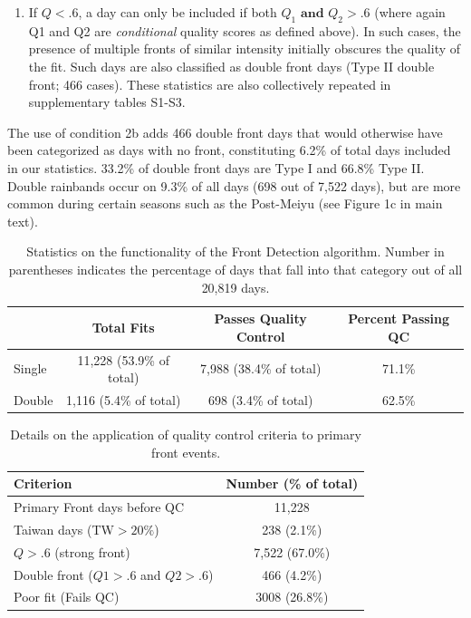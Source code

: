 \documentclass[draft,grl]{agutexSI}
\begin{document}
\begin{article}
\begin{enumerate}
\begin{enumerate}
	\item If $Q<.6$, a day can only be included if both $Q_1 \mathrm{\textbf{ and }} Q_2 > .6$ (where again Q1 and Q2 are \textit{conditional} quality scores as defined above). In such cases, the presence of multiple fronts of similar intensity initially obscures the quality of the fit. Such days are also classified as double front days (Type II double front; 466 cases). These statistics are also collectively repeated in supplementary tables S1-S3.
	
	\end{enumerate}
	
\end{enumerate}	
	
	The use of condition 2b adds 466 double front days that would otherwise have been categorized as days with no front, constituting 6.2\% of total days included in our statistics. 33.2\% of double front days are Type I and 66.8\% Type II. Double rainbands occur on 9.3\% of all days (698 out of 7,522 days), but are more common during certain seasons such as the Post-Meiyu (see Figure 1c in main text).
	
\clearpage

\begin{table}
\caption{Statistics on the functionality of the Front Detection algorithm. Number in parentheses indicates the percentage of days that fall into that category out of all 20,819 days.}
\centering

\begin{tabular}{ l c c c}
	  & Total Fits & Passes Quality Control & Percent Passing QC\\
	 \hline
	 Single & 11,228 (53.9\% of total) & 7,988 (38.4\% of total) & 71.1\% \\
	 Double & 1,116 (5.4\% of total) & 698 (3.4\% of total) & 62.5\% \\
\end{tabular}
\end{table}

\begin{table}
\caption{Details on the application of quality control criteria to primary front events.}
\centering

\begin{tabular}{ l c}
	 Criterion & Number (\% of total) \\
	 \hline
	 Primary Front days before QC & 11,228 \\
	 Taiwan days (TW$>20\%$) & 238 (2.1\%) \\
	 $Q>.6$ (strong front) & 7,522 (67.0\%) \\
	 Double front ($Q1>.6$ and $Q2>.6$) & 466 (4.2\%) \\
	 Poor fit (Fails QC) & 3008 (26.8\%) \\
	 

\end{tabular}
\end{table}
\end{article}
\end{document}
